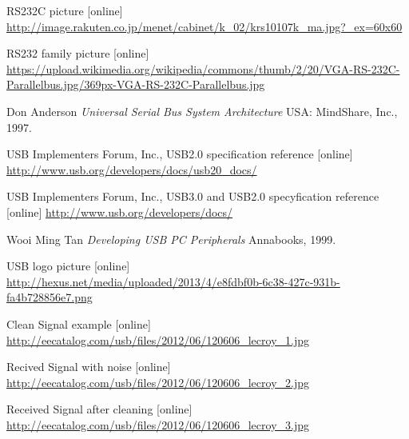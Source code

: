 \documentclass{BscUS}
\begin{document}
\begin{thebibliography}{1}

 RS232C picture [online]
\newline
\url{http://image.rakuten.co.jp/menet/cabinet/k_02/krs10107k_ma.jpg?_ex=60x60}

 RS232 family picture [online]
\newline
\url{https://upload.wikimedia.org/wikipedia/commons/thumb/2/20/VGA-RS-232C-Parallelbus.jpg/369px-VGA-RS-232C-Parallelbus.jpg}



 Don Anderson {\em Universal Serial Bus System Architecture } USA: MindShare, Inc., 1997.

 USB Implementers Forum, Inc., USB2.0 specification reference [online] 
\newline 
\url{http://www.usb.org/developers/docs/usb20_docs/}

 USB Implementers Forum, Inc., USB3.0 and USB2.0 specyfication reference [online] 
\newline 
\url{http://www.usb.org/developers/docs/}

 Wooi Ming Tan {\em Developing USB PC Peripherals } Annabooks, 1999.

 USB logo picture [online] \\
\url{http://hexus.net/media/uploaded/2013/4/e8fdbf0b-6c38-427c-931b-fa4b728856e7.png}

 Clean Signal example [online] \\
\url{http://eecatalog.com/usb/files/2012/06/120606_lecroy_1.jpg}

 Recived Signal with noise [online] \\
\url{http://eecatalog.com/usb/files/2012/06/120606_lecroy_2.jpg}

 Received Signal after cleaning [online]\\
\url{http://eecatalog.com/usb/files/2012/06/120606_lecroy_3.jpg}



\end{thebibliography}
\end{document}
